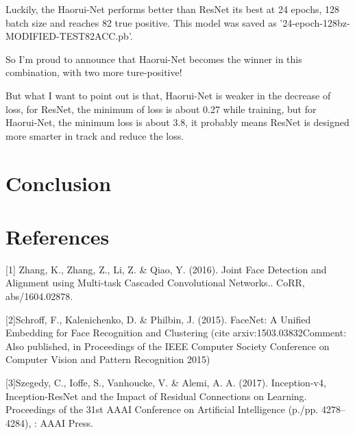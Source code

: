 \documentclass{article}
\begin{document}
Luckily, the Haorui-Net performs better than ResNet its best at 24 epochs, 128 batch size and reaches 82 true positive. This model was saved as  '24-epoch-128bz-MODIFIED-TEST82ACC.pb'.

So I'm proud to announce that Haorui-Net becomes the winner in this combination, with two more ture-positive!

But what I want to point out is that, Haorui-Net is weaker in the decrease of loss, for ResNet, the minimum of loss is about 0.27 while training, but for Haorui-Net, the minimum loss is about 3.8, it probably means ResNet is designed more smarter in track and reduce the loss.

\section{Conclusion}




\section*{References}


\medskip

\small

[1] Zhang, K., Zhang, Z., Li, Z. & Qiao, Y. (2016). Joint Face Detection and Alignment using Multi-task Cascaded Convolutional Networks.. CoRR, abs/1604.02878.

[2]Schroff, F., Kalenichenko, D. & Philbin, J. (2015). FaceNet: A Unified Embedding for Face Recognition and Clustering (cite arxiv:1503.03832Comment: Also published, in Proceedings of the IEEE Computer Society Conference on Computer Vision and Pattern Recognition 2015)

[3]Szegedy, C., Ioffe, S., Vanhoucke, V. & Alemi, A. A. (2017). Inception-v4, Inception-ResNet and the Impact of Residual Connections on Learning. Proceedings of the 31st AAAI Conference on Artificial Intelligence (p./pp. 4278--4284), : AAAI Press.
\end{document}
